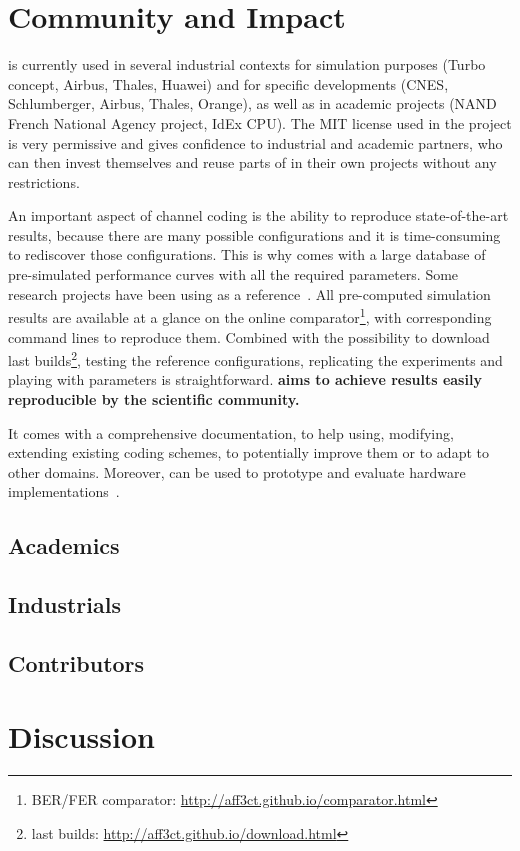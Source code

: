 \section{Community and Impact}

\AFFECT is currently used in several industrial contexts for simulation purposes
(Turbo concept, Airbus, Thales, Huawei) and for specific developments (CNES,
Schlumberger, Airbus, Thales, Orange), as well as in academic projects (NAND
French National Agency project, IdEx CPU). The MIT license used in the project
is very permissive and gives confidence to industrial and academic partners, who
can then invest themselves and reuse parts of \AFFECT in their own projects
without any restrictions.

An important aspect of channel coding is the ability to reproduce
state-of-the-art results, because there are many possible configurations and it
is time-consuming to rediscover those configurations. This is why \AFFECT comes
with a large database of pre-simulated performance curves with all the required
parameters. Some research projects have been using \AFFECT as a
reference~\cite{Leonardon2018a,Leonardon2018b,Florian2018,Pignoly2018,
Ghanaatian2018,Poulenard2018,Cavatassi2019a,Cavatassi2019b,Cenova2019,
Guermouche2019,Krainyk2019,Wang2019,Wang2019a,Hsieh2020,Rush2020,Tasdighi2020}.
All pre-computed simulation results are available at a glance on the online
comparator\footnote{BER/FER comparator:
\url{http://aff3ct.github.io/comparator.html}}, with corresponding command lines
to reproduce them. Combined with the possibility to download \AFFECT last
builds\footnote{\AFFECT last builds:
\url{http://aff3ct.github.io/download.html}}, testing the reference
configurations, replicating the experiments and playing with parameters is
straightforward. \textbf{\AFFECT aims to achieve results easily reproducible by
the scientific community.}

It comes with a comprehensive documentation, to help using, modifying, extending
existing coding schemes, to potentially improve them or to adapt to other
domains. Moreover, \AFFECT can be used to prototype and evaluate hardware
implementations~\cite{Cassagne2017a}.

\subsection{Academics}
\subsection{Industrials}
\subsection{Contributors}

\section{Discussion}